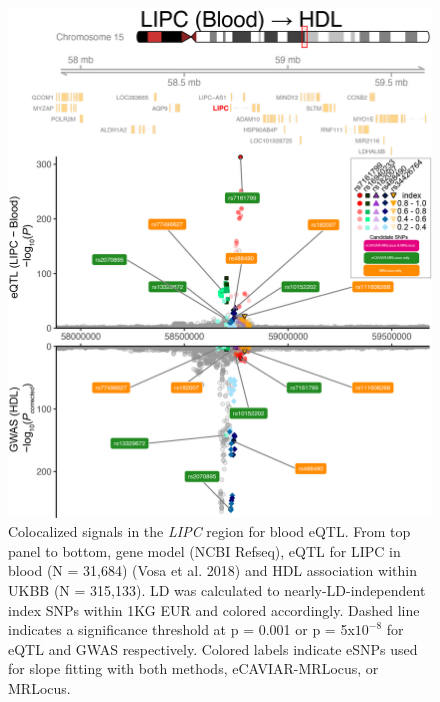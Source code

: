 \documentclass[11pt]{article}
\begin{document}
\begin{figure}[!ht]
  \centering
  \includegraphics[width=.7\textwidth]{figs/region/regionplot.LIPC_Blood_HDL_UKBB.20210114.edit.png}
  \caption{Colocalized signals in the \emph{LIPC} region for blood
    eQTL. From top panel to bottom, gene model (NCBI Refseq), eQTL for
    LIPC in blood (N = 31,684) (Vosa et al. 2018) and HDL association
    within UKBB (N = 315,133). LD was calculated to
    nearly-LD-independent index SNPs within 1KG EUR and colored
    accordingly. Dashed line indicates a significance threshold at p =
    0.001 or p = 5x$10^{-8}$ for eQTL and GWAS respectively.
    Colored labels indicate eSNPs used for slope fitting with both
    methods, eCAVIAR-MRLocus, or MRLocus.}
\end{figure}  
\end{document}
